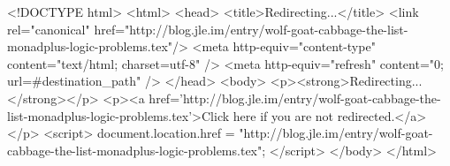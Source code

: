<!DOCTYPE html>
<html>
<head>
<title>Redirecting...</title>
<link rel="canonical" href="http://blog.jle.im/entry/wolf-goat-cabbage-the-list-monadplus-logic-problems.tex"/>
<meta http-equiv="content-type" content="text/html; charset=utf-8" />
<meta http-equiv="refresh" content="0; url=#{destination_path}" />
</head>
<body>
  <p><strong>Redirecting...</strong></p>
  <p><a href='http://blog.jle.im/entry/wolf-goat-cabbage-the-list-monadplus-logic-problems.tex'>Click here if you are not redirected.</a></p>
  <script>
    document.location.href = "http://blog.jle.im/entry/wolf-goat-cabbage-the-list-monadplus-logic-problems.tex";
  </script>
</body>
</html>
